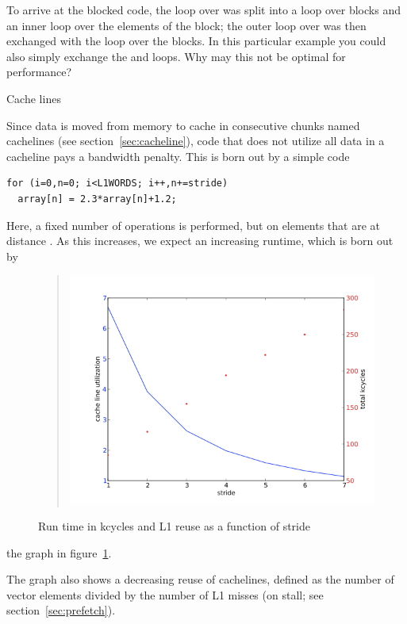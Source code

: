 \begin{exercise}
  To arrive at the blocked code, the loop over  was split into a
  loop over blocks and an inner loop over the elements of the block;
  the outer loop over  was then exchanged with the loop over the
  blocks. In this particular example you could also simply exchange
  the  and  loops. Why may this not be optimal for performance?
\end{exercise}

 {Cache lines}
\label{sec:coding-cacheline}

Since data is moved from memory to cache in consecutive chunks named
cachelines (see section~\ref{sec:cacheline}), code that does not
utilize all data in a cacheline pays a bandwidth penalty. This is born
out by a simple code
\begin{verbatim}
for (i=0,n=0; i<L1WORDS; i++,n+=stride)
  array[n] = 2.3*array[n]+1.2;
\end{verbatim}
Here, a fixed number of operations is performed, but on elements that
are at distance . As this  increases, we expect an
increasing runtime, which is born out by
\begin{figure}[ht]
  \begin{quote}
  \includegraphics[scale=.5]{graphics/cacheline8}
  \end{quote}
  \caption{Run time in kcycles and L1 reuse as a function of stride}
  \label{fig:cacheline}
\end{figure}
the graph in figure~\ref{fig:cacheline}.

The graph also shows a decreasing reuse of cachelines, defined as the
number of vector elements divided by the number of L1 misses (on
stall; see section~\ref{sec:prefetch}). 

